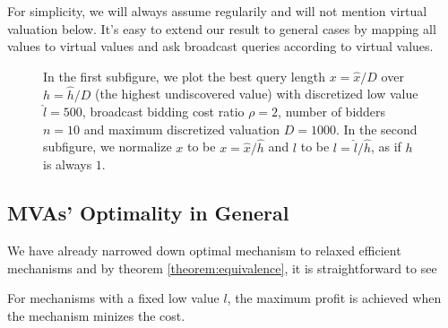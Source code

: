 For simplicity, we will always assume regularily and will not mention virtual
valuation below.  It's easy to extend our result to general cases by mapping
all values to virtual values and ask broadcast queries according to virtual
values.

\begin{figure}
\centering
  \caption{In the first subfigure, we plot the best query length $x = \hat x / D$ over $h = \hat h / D$ (the highest
      undiscovered value) with discretized low value $\hat l = 500$,
      broadcast bidding cost ratio $\rho = 2$,
      number of bidders $n = 10$ and maximum discretized valuation
      $D = 1000$. In the second subfigure, we normalize $x$ to be $x = \hat x / \hat h$ and
      $l$ to be $l = \hat l / \hat h$, as if $h$ is always $1$.}
\end{figure}

\subsection{MVAs' Optimality in General}

We have already narrowed down optimal mechanism to
relaxed efficient mechanisms and by theorem \ref{theorem:equivalence},
it is straightforward to see

\begin{corollary}

For mechanisms with a fixed low value $l$, the maximum profit is
achieved when the mechanism minizes the cost.

\end{corollary}

